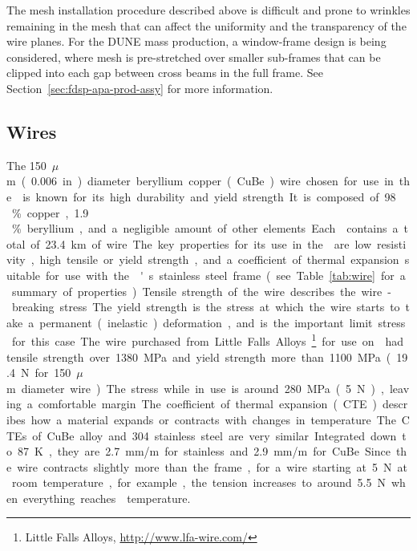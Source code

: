 The mesh installation procedure described above is difficult and prone to wrinkles remaining %
in the mesh that can affect the \efield uniformity and the transparency of the wire planes. For the DUNE mass production, a window-frame design is being considered, where mesh is pre-stretched over smaller sub-frames that can be clipped into each gap between cross beams in the full  frame.  See Section~\ref{sec:fdsp-apa-prod-assy} for more information.


\subsection{Wires}
\label{sec:fdsp-apa-wires}

The \SI{150}{$\mu$m} (\SI{.006}{in}) diameter beryllium copper (CuBe) wire chosen for use in the  is known for its high durability and yield strength. It is composed of \num{98}\,\% copper, \num{1.9}\,\% beryllium, and a negligible amount of other elements. Each  contains a total of \SI{23.4}{km} of wire.  

The key properties for its use in the  are low resistivity, high tensile or yield strength, and a coefficient of thermal expansion suitable for use with the 's stainless steel frame (see Table~\ref{tab:wire} for a summary of properties).  Tensile strength of the wire describes the wire-breaking stress.  The yield strength is the stress at which the wire starts to take a permanent (inelastic) deformation, and is the important limit stress for this case.  The wire purchased from Little Falls Alloys~\footnote{Little Falls Alloys\texttrademark, \url{http://www.lfa-wire.com/}} for use on  had tensile strength over \SI{1380}{MPa} and yield strength more than \SI{1100}{MPa} (\SI{19.4}{N} for \SI{150}{$\mu$m} diameter wire).  The stress while in use is around \SI{280}{MPa} (\SI{5}{N}), leaving a comfortable margin.

The coefficient of thermal expansion (CTE) describes how a material expands or contracts with changes in temperature.  The CTEs of CuBe alloy and \num{304} stainless steel are very similar.  Integrated down to \SI{87}{K}, they are \SI{2.7}{mm/m} for stainless and \SI{2.9}{mm/m} for CuBe. Since the wire contracts slightly more than the frame, for a wire starting at \SI{5}{N} at room temperature, for example, the tension increases to around \SI{5.5}{N} when everything reaches \lar temperature.  

